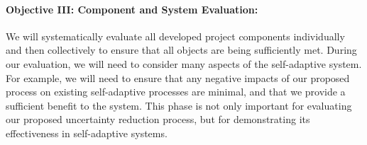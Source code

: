 \documentclass[12pt]{article}
\newcommand{\dan}[1]{\textcolor{blue}{{\it [Dan says: #1]}}}
\begin{document}
\vspace{-3mm}\paragraph{Objective III: Component and System Evaluation:}We will systematically evaluate all developed project components individually and then collectively to ensure that all objects are being sufficiently met. During our evaluation, we will need to consider many aspects of the self-adaptive system. For example, we will need to ensure that any negative impacts of our proposed process on existing self-adaptive processes are minimal, and that we provide a sufficient benefit to the system. This phase is not only important for evaluating our proposed uncertainty reduction process, but for demonstrating its effectiveness in self-adaptive systems. %











% 
\end{document}
